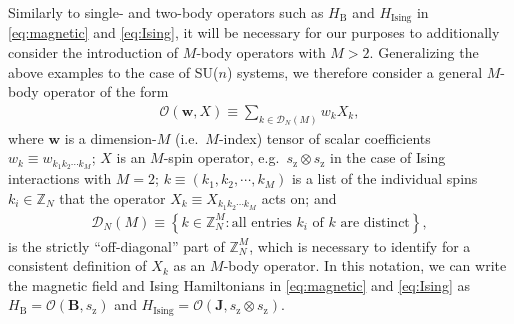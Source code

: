 \documentclass[nofootinbib,notitlepage,11pt]{revtex4-2}
\renewcommand{\t}{\text} %
\newcommand{\p}[1]{\left(#1\right)} %
\renewcommand{\set}[1]{\left\{#1\right\}} %
\newcommand{\m}{\bm} %
\newcommand{\1}{\mathds{1}}
\newcommand{\z}{\text{z}}
\newcommand{\D}{\mathcal{D}}
\renewcommand{\O}{\mathcal{O}}
\newcommand{\ZZ}{\mathbb{Z}}
\begin{document}
Similarly to single- and two-body operators such as $H_{\t{B}}$ and
$H_{\t{Ising}}$ in \eqref{eq:magnetic} and \eqref{eq:Ising}, it will
be necessary for our purposes to additionally consider the
introduction of $M$-body operators with $M>2$. Generalizing the above
examples to the case of SU($n$) systems, we therefore consider a
general $M$-body operator of the form
\begin{align}
  \O\p{\m w,X} \equiv \sum_{k\in\D_N\p{M}} w_k X_k,
  \label{eq:multi_body_op}
\end{align}
where $\m w$ is a dimension-$M$ (i.e.~$M$-index) tensor of scalar
coefficients $w_k\equiv w_{k_1k_2\cdots k_M}$; $X$ is an $M$-spin
operator, e.g.~$s_\z\otimes s_\z$ in the case of Ising interactions
with $M=2$; $k\equiv\p{k_1,k_2,\cdots,k_M}$ is a list of the
individual spins $k_i\in\ZZ_N$ that the operator
$X_k\equiv X_{k_1k_2\cdots k_M}$ acts on; and
\begin{align}
  \D_N\p{M} \equiv
  \set{ k \in \ZZ_N^M : \t{all entries $k_i$ of $k$ are distinct} },
  \label{eq:off_diags}
\end{align}
is the strictly ``off-diagonal'' part of $\ZZ_N^M$, which is necessary
to identify for a consistent definition of $X_k$ as an $M$-body
operator.  In this notation, we can write the magnetic field and Ising
Hamiltonians in \eqref{eq:magnetic} and \eqref{eq:Ising} as
$H_{\t{B}}=\O\p{\m B,s_\z}$ and
$H_{\t{Ising}}=\O\p{\m J,s_\z\otimes s_\z}$.
\end{document}
